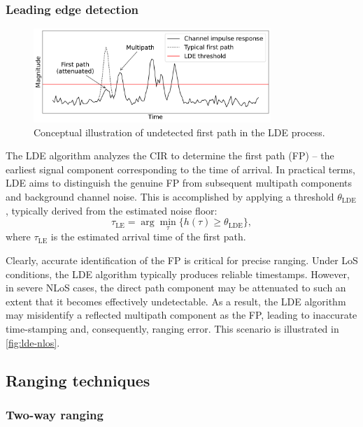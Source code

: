 \subsubsection{Leading edge detection}\label{lde}
\begin{figure}[tbh]
\includegraphics[width=0.8\textwidth]{Figures/theoretical_background/uwb_lde_error.pdf}
\centering
\caption{Conceptual illustration of undetected first path in the LDE process.}
\label{fig:lde-nlos}
\end{figure}
The LDE algorithm analyzes the CIR to determine the first path (FP) -- the earliest signal component corresponding to the time of arrival. In practical terms, LDE aims to distinguish the genuine FP from subsequent multipath components and background channel noise. This is accomplished by applying a threshold $\theta_{\text{LDE}}$, typically derived from the estimated noise floor:
\begin{equation}
\tau_{\text{LE}} = \arg \min_{\tau} \{ h(\tau) \geq \theta_{\text{LDE}} \},
\end{equation}
where $\tau_{\text{LE}}$ is the estimated arrival time of the first path.

Clearly, accurate identification of the FP is critical for precise ranging. Under LoS conditions, the LDE algorithm typically produces reliable timestamps. However, in severe NLoS cases, the direct path component may be attenuated to such an extent that it becomes effectively undetectable. As a result, the LDE algorithm may misidentify a reflected multipath component as the FP, leading to inaccurate time-stamping and, consequently, ranging error. This scenario is illustrated in \autoref{fig:lde-nlos}.

\subsection{Ranging techniques}
\subsubsection{Two-way ranging}\label{theory:twr}

